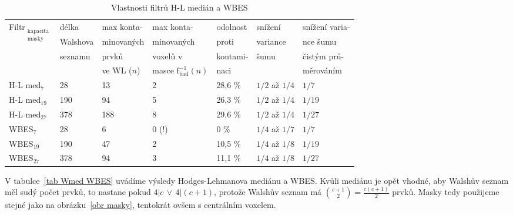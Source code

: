\begin{table}[h]
    \hspace{-0.6cm}
    \begin{tabular}{lllllll}
      \toprule
      \multirow{4}{*}{Filtr$_{\mathrm{\substack{kapacita\\ masky}}}$} &délka&max konta-& max konta- & odolnost    & snížení    & snížení varia- \\
                                        &Walshova& minovaných & minovaných & proti       & variance   & nce šumu      \\
                                        &seznamu& prvků       & voxelů v   & kontami-    & šumu       & čistým prů-     \\
                                        &       & ve WL ($n$) & masce $\mathrm{f_{bad}^{-1}}(n)$ & naci &  & měrováním  \\
      \midrule
      H-L med$_{\mathrm{7}}$            & 28  & 13  & 2                 & 28,6 \%       & $1/2$ až $1/4$    & $1/7$ \\
      H-L med$_{\mathrm{19}}$           & 190 & 94  & 5                 & 26,3 \%       & $1/2$ až $1/4$    & $1/19$ \\
      H-L med$_{\mathrm{27}}$           & 378 & 188 & 8                 & 29,6 \%       & $1/2$ až $1/4$    & $1/27$  \\
      WBES$_{\mathrm{7}}$                & 28  & 6   & 0 (!)             & 0 \%          & $1/4$ až $1/7$    & $1/7$ \\
      WBES$_{\mathrm{19}}$               & 190 & 47  & 2                 & 10,5 \%       & $1/4$ až $1/8$    & $1/19$ \\
      WBES$_{\mathrm{27}}$               & 378 & 94  & 3                 & 11,1 \%       & $1/4$ až $1/8$    & $1/27$ \\
      \bottomrule
    \end{tabular}
    \caption{Vlastnosti filtrů H-L medián a WBES}
\end{table}\label{tab WBES}

     V tabulce~\ref{tab Wmed WBES} uvádíme výsledy Hodges-Lehmanova mediánu a WBES. Kvůli mediánu je opět vhodné, aby Walshův seznam měl sudý počet prvků, to nastane pokud $4|c \,\vee\, 4|(c+1)$, protože Walshův seznam má ${c+1 \choose 2} = \frac{c(c+1)}{2}$ prvků. Masky tedy použijeme stejné jako na obrázku~\ref{obr masky}, tentokrát ovšem s centrálním voxelem.
